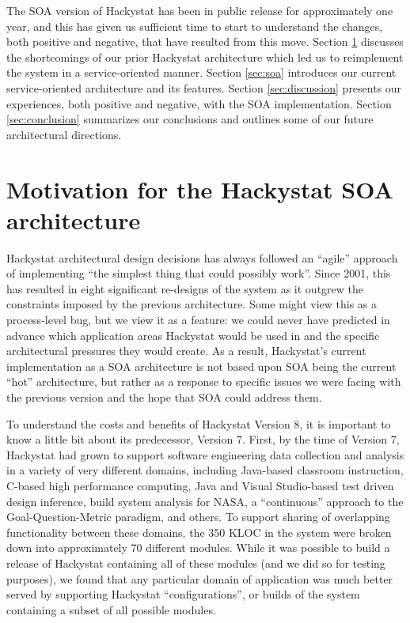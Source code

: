 \documentclass[conference,compsoc,peerreview]{IEEEtran}
\begin{document}
The SOA version of Hackystat has been in public release for approximately
one year, and this has given us sufficient time to start to understand the
changes, both positive and negative, that have resulted from this move.
Section \ref{sec:motivation} discusses the shortcomings of our prior
Hackystat architecture which led us to reimplement the system in a
service-oriented manner.  Section \ref{sec:soa} introduces our current
service-oriented architecture and its features.  Section
\ref{sec:discussion} presents our experiences, both positive and negative,
with the SOA implementation.  Section \ref{sec:conclusion} summarizes our
conclusions and outlines some of our future architectural directions.


\section{Motivation for the Hackystat SOA architecture}
\label{sec:motivation}

Hackystat architectural design decisions has always followed an ``agile''
approach of implementing ``the simplest thing that could possibly work''.
Since 2001, this has resulted in eight significant re-designs of the system
as it outgrew the constraints imposed by the previous architecture.  Some
might view this as a process-level bug, but we view it as a feature: we
could never have predicted in advance which application areas Hackystat
would be used in and the specific architectural pressures they would
create.  As a result, Hackystat's current implementation as a SOA
architecture is not based upon SOA being the current ``hot'' architecture,
but rather as a response to specific issues we were facing with the
previous version and the hope that SOA could address them.

To understand the costs and benefits of Hackystat Version 8, it is
important to know a little bit about its predecessor, Version 7.  First, by
the time of Version 7, Hackystat had grown to support software engineering data
collection and analysis in a variety of very different domains, including
Java-based classroom instruction, C-based high performance computing, Java
and Visual Studio-based test driven design inference, build system analysis
for NASA, a ``continuous'' approach to the Goal-Question-Metric paradigm,
and others.  To support sharing of overlapping functionality between these
domains, the 350 KLOC in the system were broken down into approximately 70
different modules.  While it was possible to build a release of Hackystat
containing all of these modules (and we did so for testing purposes), we
found that any particular domain of application was much better served by
supporting Hackystat ``configurations'', or builds of the system containing
a subset of all possible modules.
\end{document}
